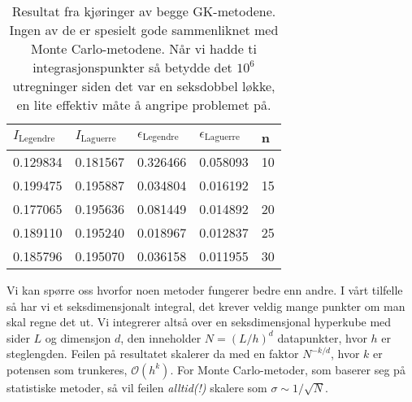 \documentclass[norsk, 10pt,twocolumn]{article}
\begin{document}

\begin{table}[H]
  \centering
  \begin{tabular}{ l l l l l}
    \toprule
    $I_{\text{Legendre}}$ & $I_{\text{Laguerre}}$ & $\epsilon_{\text{Legendre}}$ & $\epsilon_{\text{Laguerre}}$ & n \\
    \midrule
	0.129834 & 0.181567 & 0.326466 & 0.058093 & 10 \\
	0.199475 & 0.195887 & 0.034804 & 0.016192 & 15 \\
	0.177065 & 0.195636 & 0.081449 & 0.014892 & 20 \\
	0.189110 & 0.195240 & 0.018967 & 0.012837 & 25 \\
	0.185796 & 0.195070 & 0.036158 & 0.011955 & 30 \\
	\bottomrule
  \end{tabular}
  \caption{Resultat fra kjøringer av begge GK-metodene. Ingen av de er spesielt gode sammenliknet med Monte Carlo-metodene. Når vi hadde ti integrasjonspunkter så betydde det $10^6$ utregninger siden det var en seksdobbel løkke, en lite effektiv måte å angripe problemet på.}
  \label{tab:gauleg}
\end{table}
Vi kan spørre oss hvorfor noen metoder fungerer bedre enn andre. I vårt tilfelle så har vi et seksdimensjonalt integral, det krever veldig mange punkter om man skal regne det ut. Vi integrerer altså over en seksdimensjonal hyperkube med sider $L$ og dimensjon $d$, den inneholder $N=(L/h)^d$ datapunkter, hvor $h$ er steglengden. Feilen på resultatet skalerer da med en faktor $N^{-k/d}$, hvor $k$ er potensen som trunkeres, $\mathcal O(h^k)$. For Monte Carlo-metoder, som baserer seg på statistiske metoder, så vil feilen \emph{alltid(!)} skalere som $\sigma \sim 1/\sqrt N$.
\end{document}
